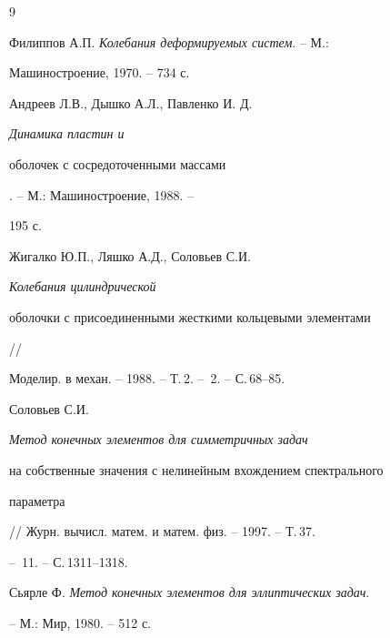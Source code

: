 \begin{thebibliography}{9} 


 




Филиппов А.П. {\em Колебания деформируемых систем}. -- М.:  


Машиностроение, 1970. -- 734 с. 




Андреев Л.В., Дышко А.Л., Павленко И. Д. {\em Динамика пластин и  


оболочек с сосредоточенными массами}. -- М.: Машиностроение, 1988. -- 


195 с. 




Жигалко Ю.П., Ляшко А.Д., Соловьев С.И. {\em Колебания цилиндрической  


оболочки с присоединенными жесткими кольцевыми элементами} // 


Моделир. в механ. -- 1988. -- Т.\,2. -- \No\,2. -- С.\,68--85. 




Соловьев С.И. {\em Метод конечных элементов для симметричных задач  


на собственные значения с нелинейным вхождением спектрального  


параметра} // Журн. вычисл. матем. и матем. физ. -- 1997. -- Т.\,37. 


-- \No\,11. -- С.\,1311--1318. 




Сьярле Ф. {\em Метод конечных элементов для эллиптических задач}.  


-- М.: Мир, 1980. -- 512 с. 


 


\end{thebibliography} 


 


\vskip 2cm 


 






 


\label{end} 


 


